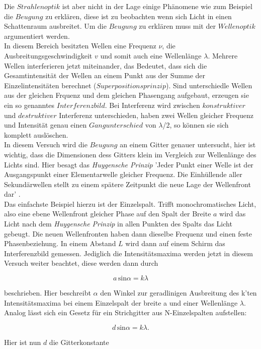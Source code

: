         \noindent Die $Strahlenoptik$ ist aber nicht in der Lage einige Phänomene wie zum Beispiel die $Beugung$ zu erklären, diese ist zu 
        beobachten wenn sich Licht in einen Schattenraum ausbreitet. Um die $Beugung$ zu erklären muss mit der $Wellenoptik$ argumentiert werden.\\
        In diesem Bereich besitzten Wellen eine Frequenz $\nu$, die Ausbreitungsgeschwindigkeit $v$ und somit auch eine Wellenlänge $\lambda$.
        Mehrere Wellen interferieren jetzt miteinander, das Bedeutet, dass sich die Gesamtintensität der Wellen an einem Punkt aus der Summe der 
        Einzelintensitäten berechnet ($Superpositionsprinzip$). Sind unterschiedle Wellen aus der gleichen Frquenz und dem gleichen Phasengang 
        aufgebaut, erzeugen sie ein so genanntes $Interferenzbild$. Bei Interferenz wird zwischen $konstruktiver$ und $destruktiver$ Interferenz 
        unterschieden, haben zwei Wellen gleicher Frequenz und Intensität genau einen $Gangunterschied$ von $\lambda$/2, so können sie sich 
        komplett auslöschen.\\
        In diesem Versuch wird die $Beugung$ an einem Gitter genauer untersucht, hier ist wichtig, dass die Dimensionen dess Gitters klein im 
        Vergleich zur Wellenlänge des Lichts sind. Hier besagt das \textit{Huygensche Prinzip} 'Jeder Punkt einer Welle ist der Ausgangspunkt einer 
        Elementarwelle gleicher Frequenz. Die Einhüllende aller Sekundärwellen stellt zu einem spätere Zeitpunkt die neue Lage der Wellenfront
        dar' \cite{400}.\\
        Das einfachste Beispiel hierzu ist der Einzelspalt. Trifft monochromatisches Licht, also eine ebene Wellenfront gleicher Phase auf den 
        Spalt der Breite $a$ wird das Licht nach dem \textit{Huygensche Prinzip} in allen Punkten des Spalts das Licht gebeugt. Die neuen Wellenfronten 
        haben dann dieselbe Frequenz und einen feste Phasenbeziehung. In einem Abstand $L$ wird dann auf einem Schirm das Interferenzbild gemessen. 
        Jediglich die Intensitätsmaxima werden jetzt in diesem Versuch weiter beachtet, diese werden dann durch 

        \begin{equation}
            a \, \text{sin} \alpha = k \lambda
        \end{equation}

        \noindent
        beschrieben. Hier beschreibt $\alpha$ den Winkel zur geradlinigen Ausbreitung des k'ten Intensitätsmaxima bei einem Einzelspalt der breite a 
        und einer Wellenlänge $\lambda$.\\
        Analog lässt sich ein Gesetz für ein Strichgitter aus N-Einzelspalten aufstellen:

        \begin{equation}
            d \, \text{sin} \alpha = k \lambda.
        \end{equation}

        \noindent Hier ist nun $d$ die Gitterkonstante 
        